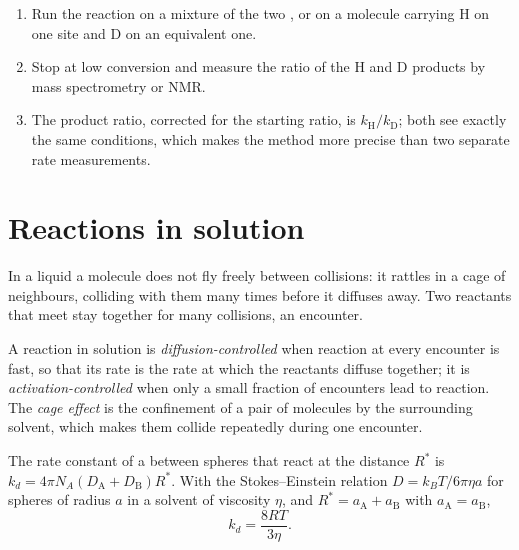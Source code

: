 \begin{method}\label{met:b3:rate-theories:kie}
\begin{enumerate}
  \item Run the reaction on a mixture of the two , or on a
        molecule carrying H on one site and D on an equivalent one.
  \item Stop at low conversion and measure the ratio of the H and D products by
        mass spectrometry or NMR.
  \item The product ratio, corrected for the starting ratio, is $k_{\mathrm H}/k_{\mathrm D}$; both
         see exactly the same conditions, which makes the method
        more precise than two separate rate measurements.
\end{enumerate}
\end{method}

\section{Reactions in solution}

In a liquid a molecule does not fly freely between collisions: it rattles in a
cage of neighbours, colliding with them many times before it diffuses away.
Two reactants that meet stay together for many collisions, an encounter.

\begin{definition}\label{def:b3:rate-theories:diffusion}
A reaction in solution is \emph{diffusion-controlled} when reaction at every encounter is fast, so that its rate is the rate
at which the reactants diffuse together; it is
\emph{activation-controlled} when only a small
fraction of encounters lead to reaction. The \emph{cage effect} is the confinement of a pair of molecules by the surrounding solvent,
which makes them collide repeatedly during one encounter.
\end{definition}

\begin{proposition}\label{prop:b3:rate-theories:smoluchowski}
The rate constant of a  between spheres that react
at the distance $R^*$ is $k_d = 4\pi N_A(D_{\mathrm A} + D_{\mathrm B})R^*$. With the Stokes--Einstein
relation $D = k_BT/6\pi\eta a$ for spheres of radius $a$ in a solvent of viscosity $\eta$,
and $R^* = a_{\mathrm A} + a_{\mathrm B}$ with $a_{\mathrm A} = a_{\mathrm B}$,
\[
  k_d = \frac{8RT}{3\eta} .
\]
\end{proposition}

